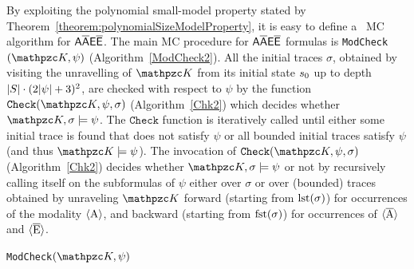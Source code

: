 By exploiting the polynomial small-model property stated by Theorem~\ref{theorem:polynomialSizeModelProperty}, it is easy to define a \PSPACE\ MC algorithm for $\mathsf{A\overline{A}E\overline{E}}$. The main MC procedure for $\mathsf{A\overline{A}E\overline{E}}$ formulas is \texttt{ModCheck}$(\Ku,\psi)$ (Algorithm~\ref{ModCheck2}). All the initial traces $\sigma$, obtained by visiting the unravelling of $\Ku$ from its initial state $s_0$ up to depth $|S|\cdot (2|\psi|+3)^2$, are checked with respect to $\psi$ by the function
$\texttt{Check}(\Ku, \psi,\sigma)$ (Algorithm~\ref{Chk2}) which decides whether $\Ku,\sigma\models \psi$. The $\texttt{Check}$ function is iteratively called until either some initial trace is found that does not satisfy $\psi$ or all bounded initial traces satisfy $\psi$ (and thus $\Ku\models\psi$). The invocation of $\texttt{Check}(\Ku, \psi,\sigma)$ (Algorithm~\ref{Chk2}) decides whether $\Ku,\sigma\models \psi$ or not by recursively calling itself on the subformulas  of $\psi$ either over $\sigma$ or over (bounded) traces obtained by unraveling $\Ku$ forward (starting from $\operatorname{lst}(\sigma)$) for occurrences of the modality  $\operatorname{\langle A\rangle}$,  and backward  (starting from $\operatorname{fst}(\sigma)$) for occurrences of $\operatorname{\langle \overline{A}\rangle}$ and
$\operatorname{\langle \overline{E}\rangle}$.

\begin{algorithm}[p]
\begin{algorithmic}[1]
	    \EndIf
	\EndFor
\end{algorithmic}
\caption{\texttt{ModCheck}$(\Ku,\psi)$}\label{ModCheck2}
\end{algorithm}


